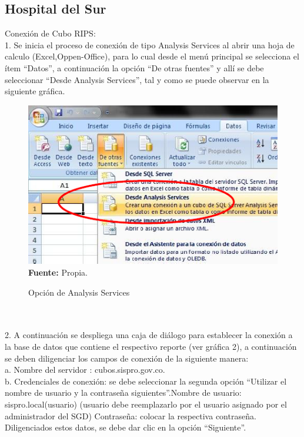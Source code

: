 \documentclass[a4paper,openright,12pt]{book}
\theoremstyle{definition}
\theoremstyle{remark}
\begin{document}
\subsection{Hospital del Sur}
Conexión de Cubo RIPS:\\
1. Se inicia el proceso de conexión de tipo Analysis Services al abrir una hoja de calculo (Excel,Oppen-Office), para lo cual desde el menú principal se selecciona el ítem “Datos”, a continuación la opción “De otras fuentes” y allí se debe seleccionar “Desde Analysis Services”, tal y como se puede observar en la siguiente gráfica.
\begin{figure}[h]
\centering
\caption{Opción de Analysis Services} 
\includegraphics[scale=0.7]{Rips1}
\label{fig:Rips1}
\\ \textbf{Fuente:} Propia.
\end{figure}\\\\
2. A continuación se despliega una caja de diálogo para establecer la conexión a la base de datos que contiene el respectivo reporte (ver gráfica 2), a continuación se deben diligenciar los campos de conexión de la siguiente manera:\\
a. Nombre del servidor : cubos.sispro.gov.co.\\
b. Credenciales de conexión: se debe seleccionar la segunda opción “Utilizar el nombre de usuario y la contraseña siguientes”.Nombre de usuario: sispro.local(usuario) (usuario debe reemplazarlo por el usuario asignado por el administrador del SGD)
Contraseña: colocar la respectiva contraseña.
Diligenciados estos datos, se debe dar clic en la opción “Siguiente”.\\
\end{document}
